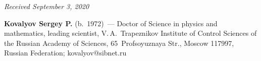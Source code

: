 \vspace*{-6pt}

\hfill{\small\textit{Received September 3, 2020}}


   
   
\Contrl

\noindent
\textbf{Kovalyov Sergey P.} (b.\ 1972)~--- Doctor of Science in physics and 
mathematics, leading scientist, V.\,A.~Trapeznikov Institute of Control Sciences of the 
Russian Academy of Sciences, 65~Profsoyuznaya Str., Moscow 117997, Russian 
Federation; \mbox{kovalyov@sibnet.ru}
   



\label{end\stat}

\renewcommand{\bibname}{\protect\rm Литература} 
   